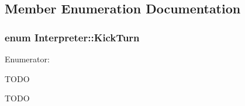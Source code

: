 \subsection{Member Enumeration Documentation}
\hypertarget{classInterpreter_ac7c3ba77d973ffbb84b12db662cfe643}{
\subsubsection[{KickTurn}]{\setlength{\rightskip}{0pt plus 5cm}enum {\bf Interpreter::KickTurn}}}
\label{classInterpreter_ac7c3ba77d973ffbb84b12db662cfe643}
\begin{Desc}
\item[Enumerator: ]\par
\begin{description}
\item[{\em 
\hypertarget{classInterpreter_ac7c3ba77d973ffbb84b12db662cfe643a8c18a3c8b220a0c8166c1ee4b3504ebe}{
OUR\_\-TURN}
\label{classInterpreter_ac7c3ba77d973ffbb84b12db662cfe643a8c18a3c8b220a0c8166c1ee4b3504ebe}
}]TODO \item[{\em 
\hypertarget{classInterpreter_ac7c3ba77d973ffbb84b12db662cfe643ac196847925fbe4bc38ee72b9b97d0f76}{
THEIR\_\-TURN}
\label{classInterpreter_ac7c3ba77d973ffbb84b12db662cfe643ac196847925fbe4bc38ee72b9b97d0f76}
}]TODO \end{description}
\end{Desc}

